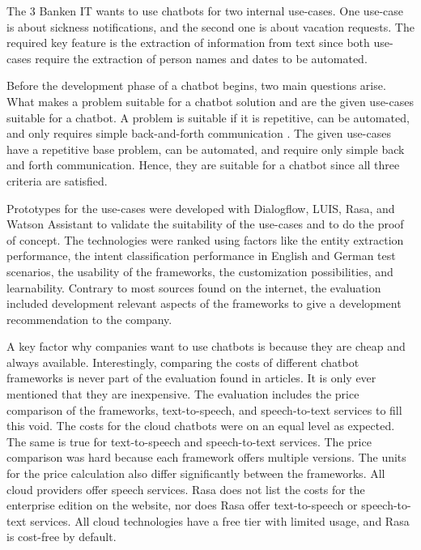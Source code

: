 The 3 Banken IT wants to use chatbots for two internal use-cases.
One use-case is about sickness notifications, and the second one is about vacation requests.
The required key feature is the extraction of information from text since both use-cases require the extraction of person names and dates to be automated.

Before the development phase of a chatbot begins, two main questions arise. 
What makes a problem suitable for a chatbot solution and are the given use-cases suitable for a chatbot.
A problem is suitable if it is repetitive, can be automated, and only requires simple back-and-forth communication \cite{buiildChatbotsPython}.
The given use-cases have a repetitive base problem, can be automated, and require only simple back and forth communication.
Hence, they are suitable for a chatbot since all three criteria are satisfied.

Prototypes for the use-cases were developed with Dialogflow, LUIS, Rasa, and Watson Assistant to validate the suitability of the use-cases and to do the proof of concept.
The technologies were ranked using factors like the entity extraction performance, the intent classification performance in English and German test scenarios, the usability of the frameworks, the customization possibilities, and learnability.
Contrary to most sources found on the internet, the evaluation included development relevant aspects of the frameworks to give a development recommendation to the company. 

A key factor why companies want to use chatbots is because they are cheap and always available.
Interestingly, comparing the costs of different chatbot frameworks is never part of the evaluation found in articles.
It is only ever mentioned that they are inexpensive.
The evaluation includes the price comparison of the frameworks, text-to-speech, and speech-to-text services to fill this void.
The costs for the cloud chatbots were on an equal level as expected.
The same is true for text-to-speech and speech-to-text services.
The price comparison was hard because each framework offers multiple versions.
The units for the price calculation also differ significantly between the frameworks. 
All cloud providers offer speech services.
Rasa does not list the costs for the enterprise edition on the website, nor does Rasa offer text-to-speech or speech-to-text services.
All cloud technologies have a free tier with limited usage, and Rasa is cost-free by default.

